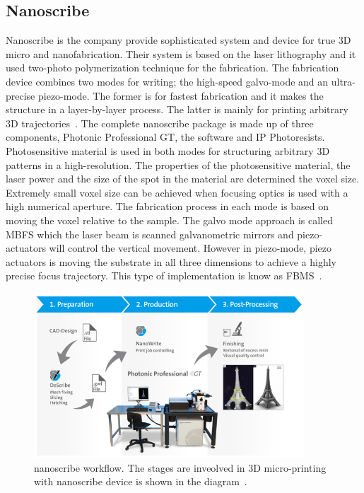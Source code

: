 \documentclass[12pt,a4paper,titlepage]{report}
\begin{document}

\subsection{Nanoscribe}\label{nanoscribe}

Nanoscribe is the company provide sophisticated system and device for true 3D
 micro and nanofabrication. Their system is based on the laser lithography and it 
used two-photo polymerization technique for the fabrication. The fabrication device combines 
two modes for writing; the high-speed galvo-mode and an ultra-precise piezo-mode. The former 
is for fastest fabrication and it makes the structure in a layer-by-layer process. The latter is mainly for
 printing arbitrary 3D trajectories~\citep{Doe:2014Feb:Online}. The complete nanoscribe 
package is made up of three components, Photonic Professional GT, the software and IP Photoresists. 
Photosensitive material is used in both modes for structuring arbitrary 3D patterns in a high-resolution. 
The properties of the photosensitive material, the laser power and the size of the spot in the material are
 determined the voxel size. Extremely small voxel size can be achieved when focusing optics is used with 
a high numerical aperture. The fabrication process in each mode is based on moving the voxel relative to
 the sample. The galvo mode approach is called \ac*{MBFS} which the laser beam is scanned 
galvanometric mirrors and piezo-actuators will control the vertical movement. However in 
piezo-mode, piezo actuators is moving the substrate in all three dimensions to achieve a highly 
precise focus trajectory. This type of implementation is know as \ac*{FBMS}~\citep{Doe:2014Feb:Online}.




\begin{figure}
  \centering
    \includegraphics[width=0.9\textwidth]{nanoscribeWorkflow}
  \caption[Nanoscribe workflow]{nanoscribe workflow. The stages are inveolved in  3D micro-printing with nanoscribe
 device is shown in the diagram~\citep{Doe:2014Feb:Online}.}
  \label{nanoscribeWorkflow}
\end{figure}
\end{document}
